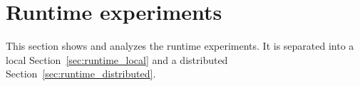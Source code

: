 \newpage
\section{Runtime experiments}
\label{sec:runtime}

This section shows and analyzes the runtime experiments.
It is separated into a local Section~\ref{sec:runtime_local} and a distributed Section~\ref{sec:runtime_distributed}.






